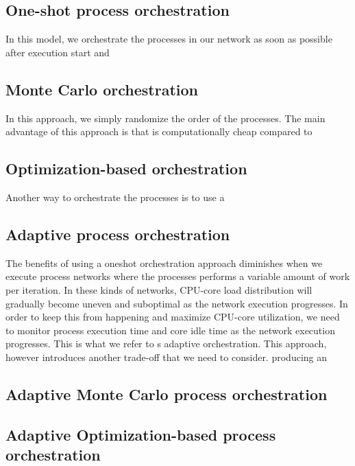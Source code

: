 \subsection{One-shot process orchestration}
In this model, we orchestrate the processes in our network as soon as
possible after execution start and

\subsection{Monte Carlo orchestration}
In this approach, we simply randomize the order of the processes. The
main advantage of this approach is that is computationally cheap
compared to

\subsection{Optimization-based orchestration}
Another way to orchestrate the processes is to use a


\subsection{Adaptive process orchestration}
The benefits of using a oneshot orchestration approach diminishes when
we execute process networks where the processes performs a variable
amount of work per iteration. In these kinds of networks, CPU-core
load distribution will gradually become uneven and suboptimal as the
network execution progresses. In order to keep this from happening and
maximize CPU-core utilization, we need to monitor process execution
time and core idle time as the network execution progresses. This is
what we refer to s adaptive orchestration. This approach, however
introduces another trade-off that we need to consider. producing an

\subsection{Adaptive Monte Carlo process orchestration}

\subsection{Adaptive Optimization-based process orchestration}



